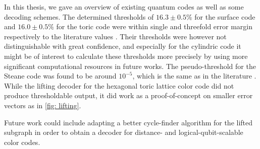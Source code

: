 In this thesis, we gave an overview of existing
quantum codes as well as some decoding schemes.
The determined thresholds of $16.3\pm 0.5 \%$ for the surface code
and $16.0\pm0.5\%$ for the toric code were within single and threefold error margin
respectively to the literature values \cite{surfaceToricThreshold}. 
Their thresholds were however not distinguishable with great confidence, 
and especially for the cylindric code it might be of interest to 
calculate these thresholds more precisely by using more significant computational
resources in future works.
The pseudo-threshold for the Steane code was found to be around $10^{-5}$, which is
the same as in the literature \cite{steaneThreshold}. 
While the lifting decoder for the hexagonal toric lattice color code did not produce
thresholdable output, it did work as a proof-of-concept on smaller error vectors as in
\ref{fig: lifting}.

Future work could include adapting a better cycle-finder algorithm for the lifted 
subgraph in order to obtain a decoder for distance- and logical-qubit-scalable color codes.